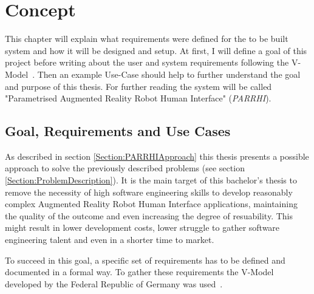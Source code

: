 \chapter{Concept}\label{Chap:Concept}

This chapter will explain what requirements were defined for the to be built system and how it will be designed and setup. At first, I will define a goal of this project before writing about the user and system requirements following the V-Model~\cite{vmodell}. Then an example Use-Case should help to further understand the goal and purpose of this thesis.  For further reading the system will be called "Parametrised Augmented Reality Robot Human Interface" (\textit{PARRHI}).

\section{Goal, Requirements and Use Cases}
As described in section \ref{Section:PARRHIApproach} this thesis presents a possible approach to solve the previously described problems (see section \ref{Section:ProblemDescription}). It is the main target of this bachelor's thesis to remove the necessity of high software engineering skills to develop reasonably complex Augmented Reality Robot Human Interface applications, maintaining the quality of the outcome and even increasing the degree of resuability. This might result in lower development costs, lower struggle to gather software engineering talent and even in a shorter time to market.

To succeed in this goal, a specific set of requirements has to be defined and documented in a formal way. To gather these requirements the V-Model developed by the Federal Republic of Germany was used~\cite{vmodell}.

